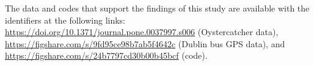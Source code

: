 \documentclass{interact}
\begin{document}
The data and codes that support the findings of this study are available with the identifiers at the following links: 
\href{https://doi.org/10.1371/journal.pone.0037997.s006}{https://doi.org/10.1371/journal.pone.0037997.s006} (Oystercatcher data),
\href{https://figshare.com/s/9fd95ce98b7ab5f4642c}{https://figshare.com/s/9fd95ce98b7ab5f4642c} (Dublin bus GPS data), and \href{https://figshare.com/s/24b7797cd30b00b45bcf}{https://figshare.com/s/24b7797cd30b00b45bcf} (code).  




\end{document}
